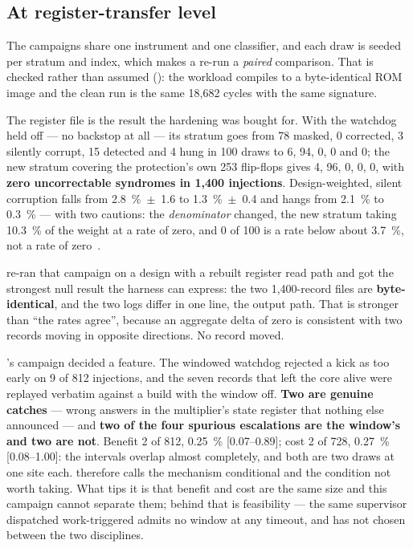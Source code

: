 \subsection{At register-transfer level}

The campaigns share one instrument and one classifier, and each draw is
seeded per stratum and index, which makes a re-run a \emph{paired}
comparison. That is checked rather than assumed (): the workload compiles to a byte-identical ROM image and the clean run is the same 18,682 cycles with the same signature.

The register file is the result the hardening was bought for. With the watchdog held off --- no backstop at all --- its  stratum goes from 78 masked, 0 corrected, 3 silently corrupt, 15 detected and 4 hung in 100 draws to 6, 94, 0, 0 and 0; the new stratum covering the protection's own 253 flip-flops gives 4, 96, 0, 0, 0, with \textbf{zero uncorrectable syndromes in 1,400 injections}. Design-weighted, silent corruption falls from \SI{2.8}{\percent}~$\pm$~1.6 to \SI{1.3}{\percent}~$\pm$~0.4 and hangs from \SI{2.1}{\percent} to \SI{0.3}{\percent} --- with two cautions: the \emph{denominator} changed, the new stratum taking \SI{10.3}{\percent} of the weight at a rate of zero, and 0 of 100 is a rate below about \SI{3.7}{\percent}, not a rate of zero~\cite{leveugle2009}.

 re-ran that campaign on a design with a rebuilt
register read path and got the strongest null result the harness can
express: the two 1,400-record files are \textbf{byte-identical}, and the
two logs differ in one line, the output path. That is stronger than
``the rates agree'', because an aggregate delta of zero is consistent
with two records moving in opposite directions. No record moved.

's campaign decided a feature. The windowed watchdog rejected a kick as too early on 9 of 812 injections, and the seven records that left the core alive were replayed verbatim against a build with the window off. \textbf{Two are
genuine catches} --- wrong answers in the multiplier's state register
that nothing else announced --- and \textbf{two of the four spurious
escalations are the window's and two are not}. Benefit 2 of 812,
\SI{0.25}{\percent} [0.07--0.89]; cost 2 of 728, \SI{0.27}{\percent}
[0.08--1.00]: the intervals overlap almost completely, and both are two
draws at one site each.  therefore calls the
mechanism conditional and the condition not worth taking. What tips it
is that benefit and cost are the same size and this campaign cannot
separate them; behind that is feasibility --- the same supervisor
dispatched work-triggered admits no window at any timeout, and
 has not chosen between the two disciplines.

